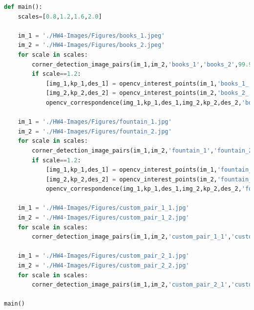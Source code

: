 \documentclass{article}
\begin{document}
\begin{lstlisting}[language=Python]
def main():
	scales=[0.8,1.2,1.6,2.0]

	im_1 = './HW4-Images/Figures/books_1.jpeg'
	im_2 = './HW4-Images/Figures/books_2.jpeg'
	for scale in scales:
		corner_detection_image_pairs(im_1,im_2,'books_1','books_2',99.99,scale)
		if scale==1.2:
			[img_1,kp_1,des_1] = opencv_interest_points(im_1,'books_1_'+str(scale))
			[img_2,kp_2,des_2] = opencv_interest_points(im_2,'books_2_'+str(scale))
			opencv_correspondence(img_1,kp_1,des_1,img_2,kp_2,des_2,'books_'+str(scale),10)
	
	im_1 = './HW4-Images/Figures/fountain_1.jpg'
	im_2 = './HW4-Images/Figures/fountain_2.jpg'
	for scale in scales:
		corner_detection_image_pairs(im_1,im_2,'fountain_1','fountain_2',99,scale)
		if scale==1.2:
			[img_1,kp_1,des_1] = opencv_interest_points(im_1,'fountain_1'+str(scale))
			[img_2,kp_2,des_2] = opencv_interest_points(im_2,'fountain_2'+str(scale))
			opencv_correspondence(img_1,kp_1,des_1,img_2,kp_2,des_2,'fountain_'+str(scale),10)

	im_1 = './HW4-Images/Figures/custom_pair_1_1.jpg'
	im_2 = './HW4-Images/Figures/custom_pair_1_2.jpg'
	for scale in scales:
		corner_detection_image_pairs(im_1,im_2,'custom_pair_1_1','custom_pair_1_2',99.95,scale)

	im_1 = './HW4-Images/Figures/custom_pair_2_1.jpg'
	im_2 = './HW4-Images/Figures/custom_pair_2_2.jpg'
	for scale in scales:
		corner_detection_image_pairs(im_1,im_2,'custom_pair_2_1','custom_pair_2_2',99.99,scale)
	
main()
\end{lstlisting}
\end{document}
